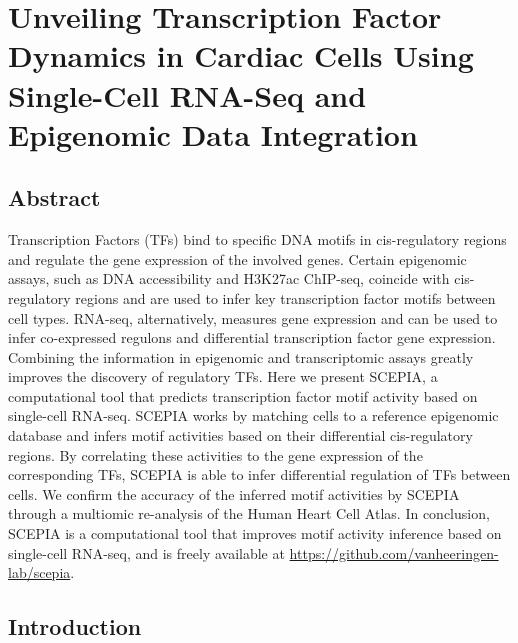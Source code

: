 \chapter{Unveiling Transcription Factor Dynamics in Cardiac Cells Using Single-Cell RNA-Seq and Epigenomic Data Integration}\thumbforchapter
{}

\newpage

\section{Abstract}

Transcription Factors (TFs) bind to specific DNA motifs in cis-regulatory regions and regulate the gene expression of the involved genes. Certain epigenomic assays, such as DNA accessibility and H3K27ac ChIP-seq, coincide with cis-regulatory regions and are used to infer key transcription factor motifs between cell types. RNA-seq, alternatively, measures gene expression and can be used to infer co-expressed regulons and differential transcription factor gene expression. Combining the information in epigenomic and transcriptomic assays greatly improves the discovery of regulatory TFs. Here we present SCEPIA, a computational tool that predicts transcription factor motif activity based on single-cell RNA-seq. SCEPIA works by matching cells to a reference epigenomic database and infers motif activities based on their differential cis-regulatory regions. By correlating these activities to the gene expression of the corresponding TFs, SCEPIA is able to infer differential regulation of TFs between cells. We confirm the accuracy of the inferred motif activities by SCEPIA through a multiomic re-analysis of the Human Heart Cell Atlas. In conclusion, SCEPIA is a computational tool that improves motif activity inference based on single-cell RNA-seq, and is freely available at \url{https://github.com/vanheeringen-lab/scepia}.

\section{Introduction}

